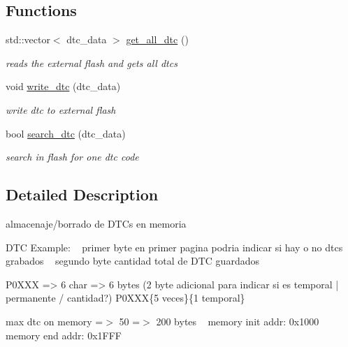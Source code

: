 \subsection*{Functions}
\begin{DoxyCompactItemize}
\item 
std\+::vector$<$ dtc\+\_\+data $>$ \hyperlink{group__DTC__IO_gaab691651197bbc8afd5b5beece67a868}{get\+\_\+all\+\_\+dtc} ()
\begin{DoxyCompactList}\small\item\em reads the external flash and gets all dtcs \end{DoxyCompactList}\item 
void \hyperlink{group__DTC__IO_gabc6581eb5f29d4e8aa0e9759368a12b8}{write\+\_\+dtc} (dtc\+\_\+data)
\begin{DoxyCompactList}\small\item\em write dtc to external flash \end{DoxyCompactList}\item 
bool \hyperlink{group__DTC__IO_ga37ca84720c4efbecb79dbbc84e088271}{search\+\_\+dtc} (dtc\+\_\+data)
\begin{DoxyCompactList}\small\item\em search in flash for one dtc code \end{DoxyCompactList}\end{DoxyCompactItemize}


\subsection{Detailed Description}
almacenaje/borrado de D\+TC\textquotesingle{}s en memoria 

D\+TC Example\+: ~\newline
primer byte en primer pagina podria indicar si hay o no dtcs grabados ~\newline
segundo byte cantidad total de D\+TC guardados ~\newline

\begin{DoxyCode}
P0XXX => 6 \textcolor{keywordtype}{char} => 6 bytes
(2 byte adicional para indicar si es temporal | permanente / cantidad?)
P0XXX\{5 veces\}\{1 temporal\}
\end{DoxyCode}
 max dtc on memory =$>$ 50 =$>$ 200 bytes ~\newline
memory init addr\+: 0x1000 ~\newline
memory end addr\+: 0x1\+F\+FF ~\newline


